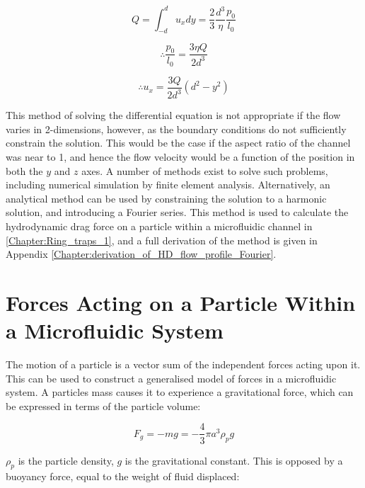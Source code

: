 \begin{equation}
 Q =  \int_{-d}^{d} u_{x} dy
= \frac{2}{3}\frac{d^{3}}{\eta} \frac{p_{0}}{l_{0}} 
\label{derivation_vfp_from_vfr}
\end{equation}

\begin{equation}
 \therefore \frac{p_{0}}{l_{0}} = \frac{3 \eta Q}{2 d^{3}}
\label{derivation_vfp_from_vfr2}
\end{equation}

\begin{equation}
 \therefore u_{x} = \frac{3 Q}{2 d^{3}}(d^{2}-y^{2})
\label{2d_solution_from_Q_navier_stokes}
\end{equation}

This method of solving the differential equation is not appropriate if the flow varies in 2-dimensions, however, as the boundary conditions do not sufficiently constrain the solution. This would be the case if the aspect ratio of the channel was near to 1, and hence the flow velocity would be a function of the position in both the $y$ and $z$ axes. A number of methods exist to solve such problems, including numerical simulation by finite element analysis. Alternatively, an analytical method can be used by constraining the solution to a harmonic solution, and introducing a Fourier series. This method is used to calculate the hydrodynamic drag force on a particle within a microfluidic channel in \cref{Chapter:Ring_traps_1}, and a full derivation of the method is given in Appendix \ref{Chapter:derivation_of_HD_flow_profile_Fourier}.

\section{Forces Acting on a Particle Within a Microfluidic System}
\label{sec:Forces_Particle_Microfluidic_System}

The motion of a particle is a vector sum of the independent forces acting upon it. This can be used to construct a generalised model of forces in a microfluidic system. A particles mass causes it to experience a gravitational force, which can be expressed in terms of the particle volume:

\begin{equation}
 F_{g} = - mg = - \frac{4}{3} \pi a^{3} \rho_{p} g 
\label{eqn:gravitational_force}
\end{equation}

$\rho_{p}$ is the particle density, $g$ is the gravitational constant. This is opposed by a buoyancy force, equal to the weight of fluid displaced:

